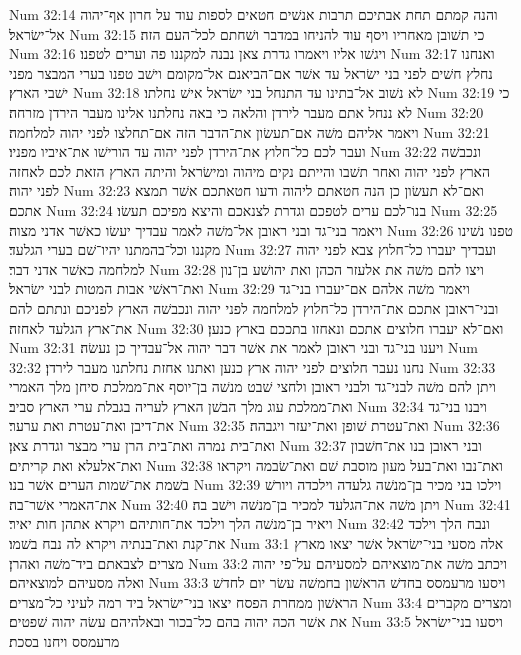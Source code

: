 Num 32:14  והנה קמתם תחת אבתיכם תרבות אנשׁים חטאים לספות עוד על חרון אף־יהוה אל־ישׂראל׃
Num 32:15  כי תשׁובן מאחריו ויסף עוד להניחו במדבר ושׁחתם לכל־העם הזה׃
Num 32:16  ויגשׁו אליו ויאמרו גדרת צאן נבנה למקננו פה וערים לטפנו׃
Num 32:17  ואנחנו נחלץ חשׁים לפני בני ישׂראל עד אשׁר אם־הביאנם אל־מקומם וישׁב טפנו בערי המבצר מפני ישׁבי הארץ׃
Num 32:18  לא נשׁוב אל־בתינו עד התנחל בני ישׂראל אישׁ נחלתו׃
Num 32:19  כי לא ננחל אתם מעבר לירדן והלאה כי באה נחלתנו אלינו מעבר הירדן מזרחה׃
Num 32:20  ויאמר אליהם משׁה אם־תעשׂון את־הדבר הזה אם־תחלצו לפני יהוה למלחמה׃
Num 32:21  ועבר לכם כל־חלוץ את־הירדן לפני יהוה עד הורישׁו את־איביו מפניו׃
Num 32:22  ונכבשׁה הארץ לפני יהוה ואחר תשׁבו והייתם נקים מיהוה ומישׂראל והיתה הארץ הזאת לכם לאחזה לפני יהוה׃
Num 32:23  ואם־לא תעשׂון כן הנה חטאתם ליהוה ודעו חטאתכם אשׁר תמצא אתכם׃
Num 32:24  בנו־לכם ערים לטפכם וגדרת לצנאכם והיצא מפיכם תעשׂו׃
Num 32:25  ויאמר בני־גד ובני ראובן אל־משׁה לאמר עבדיך יעשׂו כאשׁר אדני מצוה׃
Num 32:26  טפנו נשׁינו מקננו וכל־בהמתנו יהיו־שׁם בערי הגלעד׃
Num 32:27  ועבדיך יעברו כל־חלוץ צבא לפני יהוה למלחמה כאשׁר אדני דבר׃
Num 32:28  ויצו להם משׁה את אלעזר הכהן ואת יהושׁע בן־נון ואת־ראשׁי אבות המטות לבני ישׂראל׃
Num 32:29  ויאמר משׁה אלהם אם־יעברו בני־גד ובני־ראובן אתכם את־הירדן כל־חלוץ למלחמה לפני יהוה ונכבשׁה הארץ לפניכם ונתתם להם את־ארץ הגלעד לאחזה׃
Num 32:30  ואם־לא יעברו חלוצים אתכם ונאחזו בתככם בארץ כנען׃
Num 32:31  ויענו בני־גד ובני ראובן לאמר את אשׁר דבר יהוה אל־עבדיך כן נעשׂה׃
Num 32:32  נחנו נעבר חלוצים לפני יהוה ארץ כנען ואתנו אחזת נחלתנו מעבר לירדן׃
Num 32:33  ויתן להם משׁה לבני־גד ולבני ראובן ולחצי שׁבט מנשׁה בן־יוסף את־ממלכת סיחן מלך האמרי ואת־ממלכת עוג מלך הבשׁן הארץ לעריה בגבלת ערי הארץ סביב׃
Num 32:34  ויבנו בני־גד את־דיבן ואת־עטרת ואת ערער׃
Num 32:35  ואת־עטרת שׁופן ואת־יעזר ויגבהה׃
Num 32:36  ואת־בית נמרה ואת־בית הרן ערי מבצר וגדרת צאן׃
Num 32:37  ובני ראובן בנו את־חשׁבון ואת־אלעלא ואת קריתים׃
Num 32:38  ואת־נבו ואת־בעל מעון מוסבת שׁם ואת־שׂבמה ויקראו בשׁמת את־שׁמות הערים אשׁר בנו׃
Num 32:39  וילכו בני מכיר בן־מנשׁה גלעדה וילכדה ויורשׁ את־האמרי אשׁר־בה׃
Num 32:40  ויתן משׁה את־הגלעד למכיר בן־מנשׁה וישׁב בה׃
Num 32:41  ויאיר בן־מנשׁה הלך וילכד את־חותיהם ויקרא אתהן חות יאיר׃
Num 32:42  ונבח הלך וילכד את־קנת ואת־בנתיה ויקרא לה נבח בשׁמו׃
Num 33:1  אלה מסעי בני־ישׂראל אשׁר יצאו מארץ מצרים לצבאתם ביד־משׁה ואהרן׃
Num 33:2  ויכתב משׁה את־מוצאיהם למסעיהם על־פי יהוה ואלה מסעיהם למוצאיהם׃
Num 33:3  ויסעו מרעמסס בחדשׁ הראשׁון בחמשׁה עשׂר יום לחדשׁ הראשׁון ממחרת הפסח יצאו בני־ישׂראל ביד רמה לעיני כל־מצרים׃
Num 33:4  ומצרים מקברים את אשׁר הכה יהוה בהם כל־בכור ובאלהיהם עשׂה יהוה שׁפטים׃
Num 33:5  ויסעו בני־ישׂראל מרעמסס ויחנו בסכת׃

